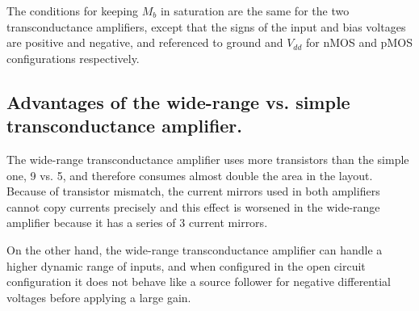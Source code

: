 The conditions for keeping \(M_b\) in saturation are the same for the two transconductance amplifiers, except that
the signs of the input and bias voltages are positive and negative, and referenced to ground and \(V_{dd}\) for nMOS and
pMOS configurations respectively.
\subsection{Advantages of the wide-range vs. simple transconductance amplifier.}
The wide-range transconductance amplifier uses more transistors than the simple one, 9 vs. 5, and therefore consumes almost double the
area in the layout. Because of transistor mismatch, the current mirrors used in both amplifiers cannot copy currents precisely and this
effect is worsened in the wide-range amplifier because it has a series of 3 current mirrors.

On the other hand, the wide-range transconductance amplifier can handle a higher dynamic range of inputs, and when configured in the open
circuit configuration it does not behave like a source follower for negative differential voltages before applying a large gain.

